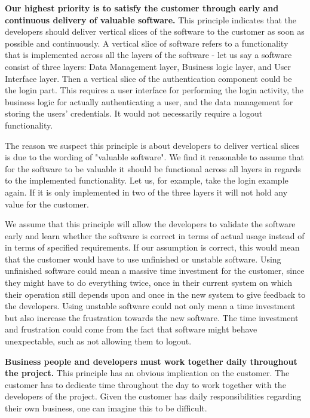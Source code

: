 \textbf{Our highest priority is to satisfy the customer through early and continuous delivery of valuable software.}
This principle indicates that the developers should deliver vertical slices of the software to the customer as soon as possible and continuously.
A vertical slice of software refers to a functionality that is implemented across all the layers of the software - let us say a software consist of three layers: Data Management layer, Business logic layer, and User Interface layer. 
Then a vertical slice of the authentication component could be the login part. 
This requires a user interface for performing the login activity, the business logic for actually authenticating a user, and the data management for storing the users' credentials. 
It would not necessarily require a logout functionality.

The reason we suspect this principle is about developers to deliver vertical slices is due to the wording of "valuable software". 
We find it reasonable to assume that for the software to be valuable it should be functional across all layers in regards to the implemented functionality. 
Let us, for example, take the login example again. 
If it is only implemented in two of the three layers it will not hold any value for the customer.

We assume that this principle will allow the developers to validate the software early and learn whether the software is correct in terms of actual usage instead of in terms of specified requirements.
If our assumption is correct, this would mean that the customer would have to use unfinished or unstable software.
Using unfinished software could mean a massive time investment for the customer, since they might have to do everything twice, once in their current system on which their operation still depends upon and once in the new system to give feedback to the developers.
Using unstable software could not only mean a time investment but also increase the frustration towards the new software.
The time investment and frustration could come from the fact that software might behave unexpectable, such as not allowing them to logout.

\textbf{Business people and developers must work together daily throughout the project.}
This principle has an obvious implication on the customer.
The customer has to dedicate time throughout the day to work together with the developers of the project.
Given the customer has daily responsibilities regarding their own business, one can imagine this to be difficult.

